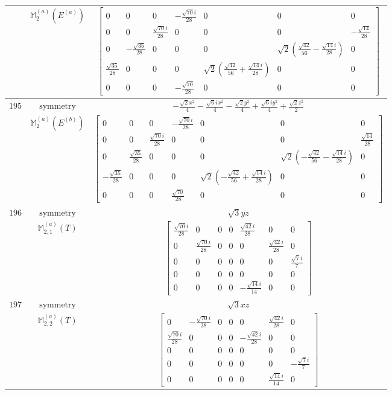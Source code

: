 \documentclass[fleqn,8pt,landscape]{jsarticle}
\begin{document}
\begin{longtable}{ccc}
$  $ & $ \mathbb{M}_{2}^{(a)}(E^{(a)}) $ & $ \begin{bmatrix} 0 & 0 & 0 & - \frac{\sqrt{70} i}{28} & 0 & 0 & 0 \\ 0 & 0 & \frac{\sqrt{70} i}{28} & 0 & 0 & 0 & - \frac{\sqrt{14}}{28} \\ 0 & - \frac{\sqrt{35}}{28} & 0 & 0 & 0 & \sqrt{2} \left(\frac{\sqrt{42}}{56} - \frac{\sqrt{14} i}{28}\right) & 0 \\ \frac{\sqrt{35}}{28} & 0 & 0 & 0 & \sqrt{2} \left(\frac{\sqrt{42}}{56} + \frac{\sqrt{14} i}{28}\right) & 0 & 0 \\ 0 & 0 & 0 & - \frac{\sqrt{70}}{28} & 0 & 0 & 0 \end{bmatrix} $ \\ \hline
$ 195 $ & $ \text{symmetry} $ & $ - \frac{\sqrt{2} x^{2}}{4} - \frac{\sqrt{6} i x^{2}}{4} - \frac{\sqrt{2} y^{2}}{4} + \frac{\sqrt{6} i y^{2}}{4} + \frac{\sqrt{2} z^{2}}{2} $ \\
$  $ & $ \mathbb{M}_{2}^{(a)}(E^{(b)}) $ & $ \begin{bmatrix} 0 & 0 & 0 & - \frac{\sqrt{70} i}{28} & 0 & 0 & 0 \\ 0 & 0 & \frac{\sqrt{70} i}{28} & 0 & 0 & 0 & \frac{\sqrt{14}}{28} \\ 0 & \frac{\sqrt{35}}{28} & 0 & 0 & 0 & \sqrt{2} \left(- \frac{\sqrt{42}}{56} - \frac{\sqrt{14} i}{28}\right) & 0 \\ - \frac{\sqrt{35}}{28} & 0 & 0 & 0 & \sqrt{2} \left(- \frac{\sqrt{42}}{56} + \frac{\sqrt{14} i}{28}\right) & 0 & 0 \\ 0 & 0 & 0 & \frac{\sqrt{70}}{28} & 0 & 0 & 0 \end{bmatrix} $ \\ \hline
$ 196 $ & $ \text{symmetry} $ & $ \sqrt{3} y z $ \\
$  $ & $ \mathbb{M}_{2,1}^{(a)}(T) $ & $ \begin{bmatrix} \frac{\sqrt{70} i}{28} & 0 & 0 & 0 & \frac{\sqrt{42} i}{28} & 0 & 0 \\ 0 & \frac{\sqrt{70} i}{28} & 0 & 0 & 0 & \frac{\sqrt{42} i}{28} & 0 \\ 0 & 0 & 0 & 0 & 0 & 0 & \frac{\sqrt{7} i}{7} \\ 0 & 0 & 0 & 0 & 0 & 0 & 0 \\ 0 & 0 & 0 & 0 & - \frac{\sqrt{14} i}{14} & 0 & 0 \end{bmatrix} $ \\ \hline
$ 197 $ & $ \text{symmetry} $ & $ \sqrt{3} x z $ \\
$  $ & $ \mathbb{M}_{2,2}^{(a)}(T) $ & $ \begin{bmatrix} 0 & - \frac{\sqrt{70} i}{28} & 0 & 0 & 0 & \frac{\sqrt{42} i}{28} & 0 \\ \frac{\sqrt{70} i}{28} & 0 & 0 & 0 & - \frac{\sqrt{42} i}{28} & 0 & 0 \\ 0 & 0 & 0 & 0 & 0 & 0 & 0 \\ 0 & 0 & 0 & 0 & 0 & 0 & - \frac{\sqrt{7} i}{7} \\ 0 & 0 & 0 & 0 & 0 & \frac{\sqrt{14} i}{14} & 0 \end{bmatrix} $ \\ \hline

\end{longtable}
\end{document}
